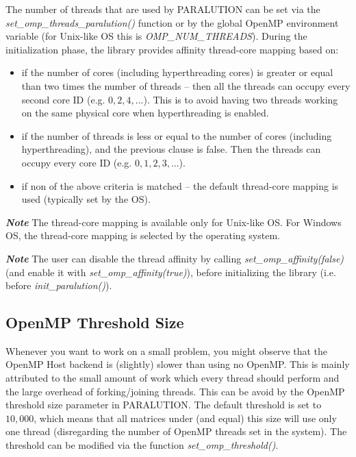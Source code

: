 The number of threads that are used by PARALUTION can be set via the \emph{set\_omp\_threads\_paralution()} function or by the global OpenMP environment variable (for Unix-like OS this is \emph{OMP\_NUM\_THREADS}). During the initialization phase, the library provides affinity thread-core mapping based on:

\begin{itemize}
\itemsep0em

\item if the number of cores (including hyperthreading cores) is greater or equal than two times the number of threads -- then all the threads can occupy every second core ID (e.g. $0,2,4,...$). This is to avoid having two threads working on the same physical core when hyperthreading is enabled.

\item if the number of threads is less or equal to the number of cores (including hyperthreading), and the previous clause is false. Then the threads can occupy every core ID (e.g. $0,1,2,3,...$).

\item if non of the above criteria is matched -- the default thread-core mapping is used (typically set by the OS).

\end{itemize}

\textbf{\emph{Note}} The thread-core mapping is available only for Unix-like OS. For Windows OS, the thread-core mapping is selected by the operating system.

\textbf{\emph{Note}} The user can disable the thread affinity by calling \emph{set\_omp\_affinity(false)} (and enable it with \emph{set\_omp\_affinity(true)}), before initializing the library (i.e. before \emph{init\_paralution()}).

\subsection{OpenMP Threshold Size}

Whenever you want to work on a small problem, you might observe that the OpenMP Host backend is (slightly) slower than using no OpenMP. This is mainly attributed to the small amount of work which every thread should perform and the large overhead of forking/joining threads. This can be avoid by the OpenMP threshold size parameter in PARALUTION. The default threshold is set to $10,000$, which means that all matrices under (and equal) this size will use only one thread (disregarding the number of OpenMP threads set in the system). The threshold can be modified via the function \emph{set\_omp\_threshold()}.

